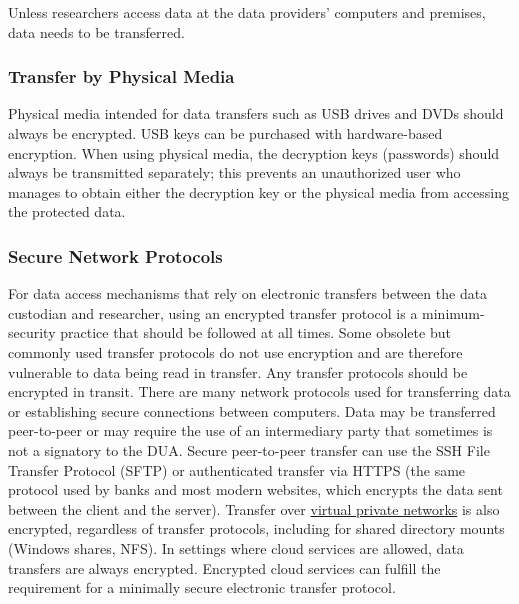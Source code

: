 Unless researchers access data at the data providers' computers and premises, data needs to be transferred.

\hypertarget{transfer-by-physical-media}{%
\subsubsection{Transfer by Physical Media}\label{transfer-by-physical-media}}

Physical media intended for data transfers such as USB drives and DVDs should always be encrypted. USB keys can be purchased with hardware-based encryption. When using physical media, the decryption keys (passwords) should always be transmitted separately; this prevents an unauthorized user who manages to obtain either the decryption key or the physical media from accessing the protected data.

\hypertarget{secure-network-protocols}{%
\subsubsection{Secure Network Protocols}\label{secure-network-protocols}}

For data access mechanisms that rely on electronic transfers between the data custodian and researcher, using an encrypted transfer protocol is a minimum-security practice that should be followed at all times. Some obsolete but commonly used transfer protocols do not use encryption and are therefore vulnerable to data being read in transfer. Any transfer protocols should be encrypted in transit. There are many network protocols used for transferring data or establishing secure connections between computers. Data may be transferred peer-to-peer or may require the use of an intermediary party that sometimes is not a signatory to the DUA. Secure peer-to-peer transfer can use the SSH File Transfer Protocol (SFTP) or authenticated transfer via HTTPS (the same protocol used by banks and most modern websites, which encrypts the data sent between the client and the server). Transfer over \protect\hyperlink{virtual-private-networks}{virtual private networks} is also encrypted, regardless of transfer protocols, including for shared directory mounts (Windows shares, NFS). In settings where cloud services are allowed, data transfers are always encrypted. Encrypted cloud services can fulfill the requirement for a minimally secure electronic transfer protocol.

